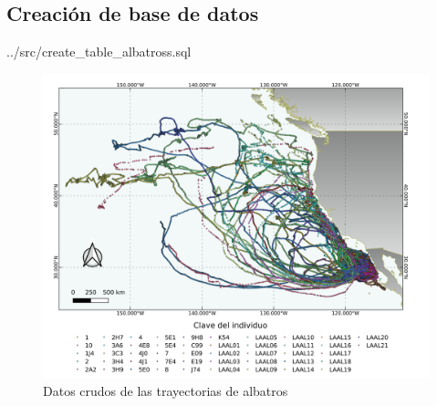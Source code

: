 \subsection{Creación de base de datos}

 {../src/create_table_albatross.sql}

\begin{figure}[h!]
    \includegraphics[scale=0.60]{figures/RawData.png}
    \caption{Datos crudos de las trayectorias de albatros}
    \label{fig:trayectorias}
    \centering
\end{figure}
